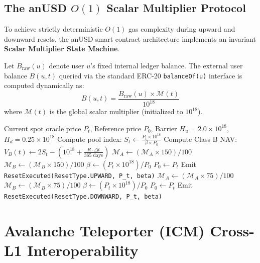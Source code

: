 \documentclass[11pt,a4paper]{article}
\begin{document}
\subsection{The anUSD $O(1)$ Scalar Multiplier Protocol}
To achieve strictly deterministic $O(1)$ gas complexity during upward and downward resets, the anUSD smart contract architecture implements an invariant \textbf{Scalar Multiplier State Machine}.

Let $B_{\text{raw}}(u)$ denote user $u$'s fixed internal ledger balance. The external user balance $B(u, t)$ queried via the standard ERC-20 \texttt{balanceOf(u)} interface is computed dynamically as:
\begin{equation}
    B(u, t) = \frac{B_{\text{raw}}(u) \times \mathcal{M}(t)}{10^{18}}
\end{equation}
where $\mathcal{M}(t)$ is the global scalar multiplier (initialized to $10^{18}$).

\begin{algorithm}[H]
\caption{$O(1)$ Constant-Time Dynamic Reset Execution}
\label{alg:reset_algo_full}
\begin{algorithmic}[1]
\REQUIRE Current spot oracle price $P_t$, Reference price $P_0$, Barrier $H_u = 2.0 \times 10^{18}$, $H_d = 0.25 \times 10^{18}$
\STATE Compute pool index: $S_t \leftarrow \frac{P_t \times 10^{18}}{\beta \times P_0}$
\STATE Compute Class B NAV: $V_B(t) \leftarrow 2 S_t - (10^{18} + \frac{R \cdot \Delta t}{365 \text{ days}})$
    \STATE {}
    \STATE $\mathcal{M}_A \leftarrow (\mathcal{M}_A \times 150) / 100$
    \STATE $\mathcal{M}_B \leftarrow (\mathcal{M}_B \times 150) / 100$
    \STATE $\beta \leftarrow (P_t \times 10^{18}) / P_0$
    \STATE $P_0 \leftarrow P_t$
    \STATE Emit \texttt{ResetExecuted(ResetType.UPWARD, P\_t, beta)}
    \STATE {}
    \STATE $\mathcal{M}_A \leftarrow (\mathcal{M}_A \times 75) / 100$
    \STATE $\mathcal{M}_B \leftarrow (\mathcal{M}_B \times 75) / 100$
    \STATE $\beta \leftarrow (P_t \times 10^{18}) / P_0$
    \STATE $P_0 \leftarrow P_t$
    \STATE Emit \texttt{ResetExecuted(ResetType.DOWNWARD, P\_t, beta)}
\ENDIF
\end{algorithmic}
\end{algorithm}

\section{Avalanche Teleporter (ICM) Cross-L1 Interoperability}
\end{document}
